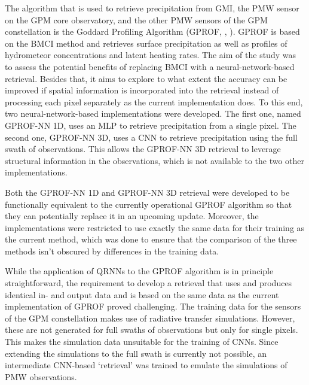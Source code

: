 The algorithm that is used to retrieve precipitation from GMI, the PMW
sensor on the GPM core observatory, and the other PMW sensors of the GPM
constellation is the Goddard Profiling Algorithm (GPROF,
\citeauthor{kummerow15}, \citeyear{kummerow15}). GPROF is based on the BMCI
method and retrieves surface precipitation as well as profiles of hydrometeor
concentrations and latent heating rates. The aim of the study was to assess the
potential benefits of replacing BMCI with a neural-network-based retrieval.
Besides that, it aims to explore to what extent the accuracy can be improved if
spatial information is incorporated into the retrieval instead of processing
each pixel separately as the current implementation does. To this end, two
neural-network-based implementations were developed. The first one, named
GPROF-NN 1D, uses an MLP to retrieve precipitation from a single pixel. The
second one, GPROF-NN 3D, uses a CNN to retrieve precipitation using  the full
swath of observations. This allows the GPROF-NN 3D retrieval to leverage
structural information in the observations, which is not available to the two
other implementations.

Both the GPROF-NN 1D and GPROF-NN 3D retrieval were developed to be functionally
equivalent to the currently operational GPROF algorithm so that they can
potentially replace it in an upcoming update. Moreover, the implementations were
restricted to use exactly the same data for their training as the current
method, which was done to ensure that the comparison of the three methods isn't
obscured by differences in the training data.

While the application of QRNNs to the GPROF algorithm is in principle
straightforward, the requirement to develop a retrieval that uses and produces
identical in- and output data and is based on the same data as the current
implementation of GPROF proved challenging. The training data for the sensors of
the GPM constellation makes use of radiative transfer simulations. However,
these are not generated for full swaths of observations but only for single
pixels. This makes the simulation data unsuitable for the training of CNNs.
Since extending the simulations to the full swath is currently not possible, an
intermediate CNN-based `retrieval' was trained to emulate the simulations of PMW
observations.


